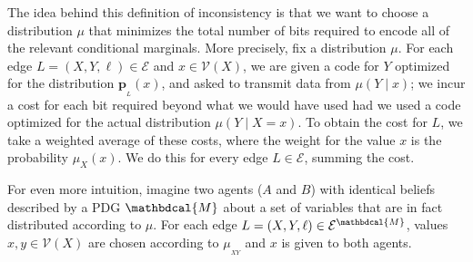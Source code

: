 \documentclass{article}
\theoremstyle{plain}
\theoremstyle{definition}
\theoremstyle{remark}
\newcommand\mat[1]{\mathbf{#1}}
\newcommand{\bp}[1][L]{\mat{p}_{\!_{#1}\!}}
\newcommand{\V}{\mathcal V}
\newcommand{\Ed}{\mathcal E}
\newcommand{\dg}[1]{\mathbdcal{#1}}
\numberwithin{equation}{section}
\begin{document}
\begin{vfull}
The idea behind this definition of inconsistency is that we want to choose a
distribution $\mu$ that minimizes the total number of bits required to encode
all of the relevant conditional marginals. More precisely, fix a distribution
$\mu$. For each edge $L = (X, Y,
\ell) \in \Ed$ and $x \in \V(X)$, we are given a code for $Y$ optimized for the
distribution $\bp(x)$, and asked to transmit
data from $\mu(Y\mid x)$; we incur a cost for each bit required beyond what we
would have used had we used a code optimized for the actual distribution
$\mu(Y\mid X=x)$. To obtain the cost for $L$, we take a weighted average of
these costs, where the weight for the value $x$ is the probability $\mu_X(x)$.
We do this for every edge $L \in \Ed$, summing the cost.

For even more intuition, imagine two agents ($A$ and $B$) with identical beliefs described by a PDG $\dg M$ about a set of variables that are in fact distributed according to $\mu$. For each edge $L = (X,Y, \ell) \in \Ed^\dg M$, values $x,y \in \V(X)$ are chosen according to $\mu_{_{XY}}$ and $x$ is given to both agents. 


\end{vfull}
\end{document}
